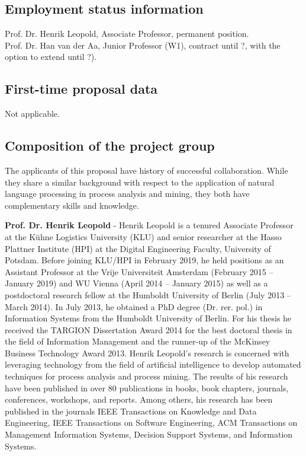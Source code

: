 

\subsection{Employment status information}

Prof. Dr. Henrik Leopold, Associate Professor, permanent position.\\
Prof. Dr. Han van der Aa, Junior Professor (W1), contract until ?, with the option to extend until ?).


\subsection{First-time proposal data}

Not applicable.

\subsection{Composition of the project group}



The applicants of this proposal have history of successful collaboration. While they share a similar background with respect to the application of natural language processing in process analysis and mining, they both have complementary skills and knowledge. 

\textbf{Prof. Dr. Henrik Leopold} - Henrik Leopold is a tenured Associate Professor at the K\"uhne Logistics University (KLU) and senior researcher at the Hasso Plattner Institute (HPI) at the Digital Engineering Faculty, University of Potsdam. Before joining KLU/HPI in February 2019, he held positions as an Assistant Professor at the Vrije Universiteit Amsterdam (February 2015 – January 2019) and WU Vienna (April 2014 – January 2015) as well as a postdoctoral research fellow at the Humboldt University of Berlin (July 2013 – March 2014). In July 2013, he obtained a PhD degree (Dr. rer. pol.) in Information Systems from the Humboldt University of Berlin. For his thesis he received the TARGION Dissertation Award 2014 for the best doctoral thesis in the field of Information Management and the runner-up of the McKinsey Business Technology Award 2013. Henrik Leopold's research is concerned with leveraging technology from the field of artificial intelligence to develop automated techniques for process analysis and process mining. The results of his research have been published in over 80 publications in books, book chapters, journals, conferences, workshops, and reports. Among others, his research has been published in the journals IEEE Transactions on Knowledge and Data Engineering, IEEE Transactions on Software Engineering, ACM Transactions on Management Information Systems, Decision Support Systems, and Information Systems. 


